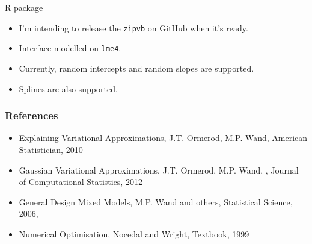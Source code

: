 \documentclass{beamer}
\begin{document}
	
	
	\begin{frame}{R package}
		\begin{itemize}
			\item I'm intending to release the \texttt{zipvb} on GitHub when it's ready.
			\item Interface modelled on \texttt{lme4}.
			\item Currently, random intercepts and random slopes are supported.
			\item Splines are also supported.
		\end{itemize}	
	\end{frame}
	
	\begin{frame}
		\frametitle{References}
		\begin{itemize}
			\item Explaining Variational Approximations, J.T. Ormerod, M.P. Wand, American Statistician, 2010
			\item Gaussian Variational Approximations, J.T. Ormerod, M.P. Wand, , Journal of Computational Statistics, 2012
			\item General Design Mixed Models, M.P. Wand and others, Statistical Science, 2006, 
			\item Numerical Optimisation, Nocedal and Wright, Textbook, 1999
		\end{itemize}
	\end{frame}
	
\end{document}
